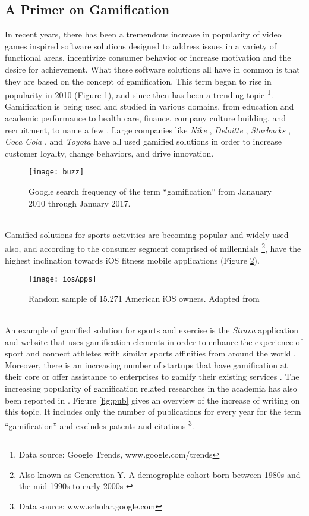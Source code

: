 \subsection{A Primer on Gamification}
In recent years, there has been a tremendous increase in popularity of video games inspired software solutions designed to address issues in a variety of functional areas, incentivize consumer behavior or increase motivation and the desire for achievement. What these software solutions all have in common is that they are based on the concept of gamification. This term began to rise in popularity in 2010 (Figure \ref{fig:buzz}), and since then has been a trending topic \footnote{Data source: Google Trends, www.google.com/trends}. Gamification is being used and studied in various domains, from education and academic performance to health care, finance, company culture building, and recruitment, to name a few \cite{gamificationExamples, gamificationWiki, enterpriseGamify}. Large companies like \textit{Nike} \cite{nikePlus}, \textit{Deloitte} \cite{deloitte}, \textit{Starbucks} \cite{starbucks}, \textit{Coca Cola} \cite{coke}, and \textit{Toyota} \cite{toyota} have all used gamified solutions in order to increase customer loyalty, change behaviors, and drive innovation. \pagebreak 
\begin{figure}[h]
    \centering
    \texttt{[image: buzz]}
    \caption{Google search frequency of the term ``gamification'' from Janauary 2010 through January 2017.}
    \label{fig:buzz}
\end{figure}\\
Gamified solutions for sports activities are becoming popular and widely used also, and according to \cite{iosPopulatity} the consumer segment comprised of millennials \footnote{Also known as Generation Y. A demographic cohort born between 1980s and the mid-1990s to early 2000s \cite{mill}}, have the highest inclination towards iOS fitness mobile applications (Figure \ref{fig:iosApps}). 
\begin{figure}[h]
    \centering
    \texttt{[image: iosApps]}
    \caption{Random sample of 15.271 American iOS owners. Adapted from \cite{iosPopulatity}}
    \label{fig:iosApps}
\end{figure}\\
An example of gamified solution for sports and exercise is the \textit{Strava} application and website that uses gamification elements in order to enhance the experience of sport and connect athletes with similar sports affinities from around the world \cite{strava}. Moreover, there is an increasing number of startups \cite{foursquare, codeacademy} that have gamification at their core or offer assistance to enterprises to gamify their existing services \cite{badgeville}. The increasing popularity of gamification related researches in the academia has also been reported in \cite{hamari2014does}. Figure \ref{fig:pub} gives an overview of the increase of writing on this topic. It includes only the number of publications for every year for the term ``gamification'' and excludes patents and citations \footnote{Data source: www.scholar.google.com}. 
